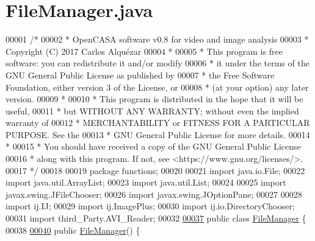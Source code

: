 \hypertarget{_file_manager_8java_source}{}\section{File\+Manager.\+java}
\label{_file_manager_8java_source}

\begin{DoxyCode}
00001 \textcolor{comment}{/*}
00002 \textcolor{comment}{ *   OpenCASA software v0.8 for video and image analysis}
00003 \textcolor{comment}{ *   Copyright (C) 2017  Carlos Alquézar}
00004 \textcolor{comment}{ *}
00005 \textcolor{comment}{ *   This program is free software: you can redistribute it and/or modify}
00006 \textcolor{comment}{ *   it under the terms of the GNU General Public License as published by}
00007 \textcolor{comment}{ *   the Free Software Foundation, either version 3 of the License, or}
00008 \textcolor{comment}{ *   (at your option) any later version.}
00009 \textcolor{comment}{ *}
00010 \textcolor{comment}{ *   This program is distributed in the hope that it will be useful,}
00011 \textcolor{comment}{ *   but WITHOUT ANY WARRANTY; without even the implied warranty of}
00012 \textcolor{comment}{ *   MERCHANTABILITY or FITNESS FOR A PARTICULAR PURPOSE.  See the}
00013 \textcolor{comment}{ *   GNU General Public License for more details.}
00014 \textcolor{comment}{ *}
00015 \textcolor{comment}{ *   You should have received a copy of the GNU General Public License}
00016 \textcolor{comment}{ *   along with this program.  If not, see <https://www.gnu.org/licenses/>.}
00017 \textcolor{comment}{*/}    
00018 
00019 \textcolor{keyword}{package }functions;
00020 
00021 \textcolor{keyword}{import} java.io.File;
00022 \textcolor{keyword}{import} java.util.ArrayList;
00023 \textcolor{keyword}{import} java.util.List;
00024 
00025 \textcolor{keyword}{import} javax.swing.JFileChooser;
00026 \textcolor{keyword}{import} javax.swing.JOptionPane;
00027 
00028 \textcolor{keyword}{import} ij.IJ;
00029 \textcolor{keyword}{import} ij.ImagePlus;
00030 \textcolor{keyword}{import} ij.io.DirectoryChooser;
00031 \textcolor{keyword}{import} third\_Party.AVI\_Reader;
00032 
\hypertarget{_file_manager_8java_source_l00037}{}\hyperlink{classfunctions_1_1_file_manager}{00037} \textcolor{keyword}{public} \textcolor{keyword}{class }\hyperlink{classfunctions_1_1_file_manager}{FileManager} \{
00038 
\hypertarget{_file_manager_8java_source_l00040}{}\hyperlink{classfunctions_1_1_file_manager_a0ad324c611d51ae061bcf3105c84aef0}{00040}   \textcolor{keyword}{public} \hyperlink{classfunctions_1_1_file_manager_a0ad324c611d51ae061bcf3105c84aef0}{FileManager}() \{

\end{DoxyCode}
